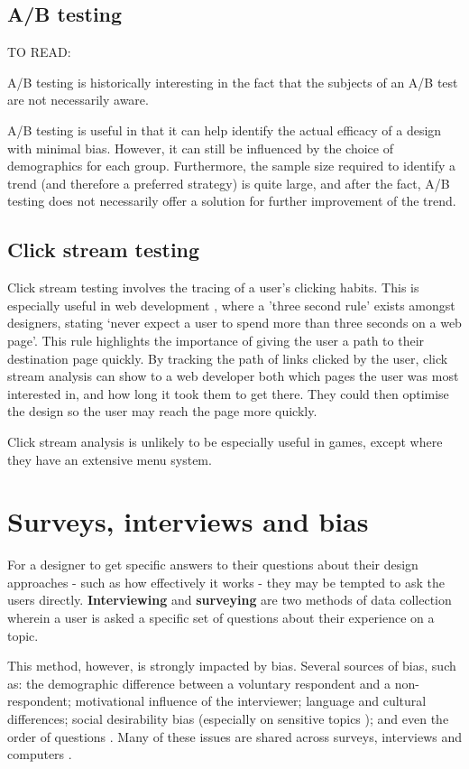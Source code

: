 \documentclass{scrartcl}
\begin{document}
\subsection{A/B testing}
TO READ: \cite{abintro}

A/B testing is historically interesting in the fact that the subjects of an A/B test are not necessarily aware.

A/B testing is useful in that it can help identify the actual efficacy of a design with minimal bias. However, it can still be influenced by the choice of demographics for each group. Furthermore, the sample size required to identify a trend (and therefore a preferred strategy) is quite large, and after the fact, A/B testing does not necessarily offer a solution for further improvement of the trend.

\subsection{Click stream testing}
Click stream testing involves the tracing of a user's clicking habits. This is especially useful in web development , where a 'three second rule' exists amongst designers, stating `never expect a user to spend more than three seconds on a web page'. This rule highlights the importance of giving the user a path to their destination page quickly. By tracking the path of links clicked by the user, click stream analysis can show to a web developer both which pages the user was most interested in, and how long it took them to get there. They could then optimise the design so the user may reach the page more quickly.

Click stream analysis is unlikely to be especially useful in games, except where they have an extensive menu system.

\section{Surveys, interviews and bias}
For a designer to get specific answers to their questions about their design approaches - such as how effectively it works - they may be tempted to ask the users directly. \textbf{Interviewing} and \textbf{surveying} are two methods of data collection wherein a user is asked a specific set of questions about their experience on a topic.

This method, however, is strongly impacted by bias. Several sources of bias, such as: the demographic difference between a voluntary respondent and a non-respondent; motivational influence of the interviewer; language and cultural differences; social desirability bias (especially on sensitive topics \cite{sensitivequestions}); and even the order of questions \cite{questionnairebias}. Many of these issues are shared across surveys, interviews and computers \cite{moresurveybias} \cite{questionnairebias}.
\end{document}
